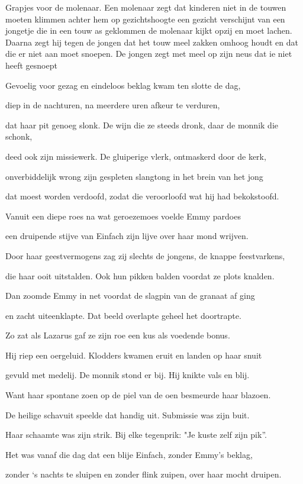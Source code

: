 Grapjes voor de molenaar. Een molenaar zegt dat kinderen niet in de touwen moeten klimmen achter hem op gezichtshoogte een gezicht verschijnt van een jongetje die in een touw as geklommen de molenaar kijkt opzij en moet lachen. Daarna zegt hij tegen de jongen dat het touw meel zakken omhoog houdt en dat die er niet aan moet snoepen. De jongen zegt met meel op zijn neus dat ie niet heeft gesnoept

Gevoelig voor gezag
en eindeloos beklag
kwam ten slotte de dag,

diep in de nachturen,
na meerdere uren
afkeur te verduren,

dat haar pit genoeg slonk.
De wijn die ze steeds dronk,
daar de monnik die schonk,

deed ook zijn missiewerk.
De gluiperige vlerk,
ontmaskerd door de kerk,

onverbiddelijk wrong zijn
gespleten slangtong
in het brein van het jong

dat moest worden verdoofd,
zodat die veroorloofd
wat hij had bekokstoofd.

Vanuit een diepe roes
na wat geroezemoes voelde
Emmy pardoes

een druipende stijve
van Einfach zijn lijve
over haar mond wrijven.

Door haar geestvermogens
zag zij slechts de jongens,
de knappe feestvarkens,

die haar ooit uitstalden.
Ook hun pikken balden
voordat ze plots knalden.

Dan zoomde Emmy in
net voordat de slagpin
van de granaat af ging

en zacht uiteenklapte.
Dat beeld overlapte
geheel het doortrapte.

Zo zat als Lazarus
gaf ze zijn roe een kus
als voedende bonus.

Hij riep een oergeluid.
Klodders kwamen eruit
en landen op haar snuit

gevuld met medelij.
De monnik stond er bij.
Hij knikte vals en blij.

Want haar spontane zoen
op de piel van de oen
besmeurde haar blazoen.

De heilige schavuit
speelde dat handig uit.
Submissie was zijn buit.

Haar schaamte was zijn strik.
Bij elke tegenprik:
"Je kuste zelf zijn pik”.

Het was vanaf die dag
dat een blije Einfach,
zonder Emmy’s beklag,

zonder ‘s nachts te sluipen
en zonder flink zuipen,
over haar mocht druipen.

